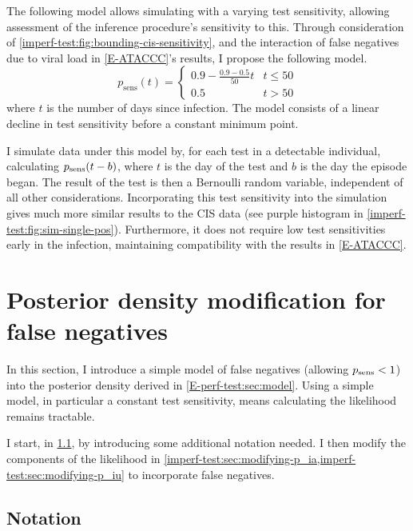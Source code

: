\documentclass[thesis.tex]{subfiles}
\begin{document}
The following model allows simulating with a varying test sensitivity, allowing assessment of the inference procedure's sensitivity to this.
Through consideration of \cref{imperf-test:fig:bounding-cis-sensitivity}, and the interaction of false negatives due to viral load in \cref{E-ATACCC}'s results, I propose the following model.
\begin{equation}
  p_\text{sens}(t) = \begin{cases}
    0.9 - \frac{0.9-0.5}{50}t &t \leq 50 \\
    0.5 &t > 50
  \end{cases}
  \label{imperf-test:eq:variable-test-sensitivity}
\end{equation}
where $t$ is the number of days since infection.
The model consists of a linear decline in test sensitivity before a constant minimum point.

I simulate data under this model by, for each test in a detectable individual, calculating $p_\text{sens}(t-b)$, where $t$ is the day of the test and $b$ is the day the episode began.
The result of the test is then a Bernoulli random variable, independent of all other considerations.
Incorporating this test sensitivity into the simulation gives much more similar results to the CIS data (see purple histogram in \cref{imperf-test:fig:sim-single-pos}).
Furthermore, it does not require low test sensitivities early in the infection, maintaining compatibility with the results in \cref{E-ATACCC}.

\section{Posterior density modification for false negatives} \label{imperf-test:sec:modelling}

In this section, I introduce a simple model of false negatives (\ie allowing $p_\text{sens} < 1$) into the posterior density derived in \cref{E-perf-test:sec:model}.
Using a simple model, in particular a constant test sensitivity, means calculating the likelihood remains tractable.

I start, in \cref{imperf-test:sec:notation}, by introducing some additional notation needed.
I then modify the components of the likelihood in \cref{imperf-test:sec:modifying-p_ia,imperf-test:sec:modifying-p_iu} to incorporate false negatives.

\subsection{Notation} \label{imperf-test:sec:notation}
\end{document}
